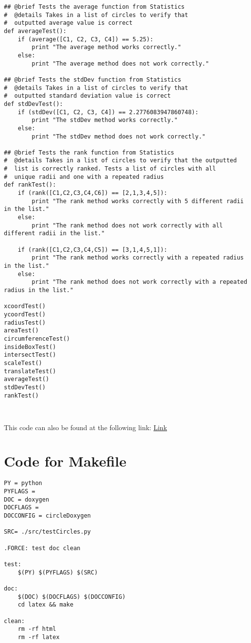 \documentclass[12pt]{article}
\begin{document}
\begin{lstlisting}
## @brief Tests the average function from Statistics
#  @details Takes in a list of circles to verify that
#  outputted average value is correct
def averageTest():
    if (average([C1, C2, C3, C4]) == 5.25):
        print "The average method works correctly."
    else:
        print "The average method does not work correctly."

## @brief Tests the stdDev function from Statistics
#  @details Takes in a list of circles to verify that
#  outputted standard deviation value is correct
def stdDevTest():
    if (stdDev([C1, C2, C3, C4]) == 2.2776083947860748):
        print "The stdDev method works correctly."
    else:
        print "The stdDev method does not work correctly."

## @brief Tests the rank function from Statistics
#  @details Takes in a list of circles to verify that the outputted
#  list is correctly ranked. Tests a list of circles with all
#  unique radii and one with a repeated radius
def rankTest():
    if (rank([C1,C2,C3,C4,C6]) == [2,1,3,4,5]):
        print "The rank method works correctly with 5 different radii in the list."
    else:
        print "The rank method does not work correctly with all different radii in the list."

    if (rank([C1,C2,C3,C4,C5]) == [3,1,4,5,1]):
        print "The rank method works correctly with a repeated radius in the list."
    else:
        print "The rank method does not work correctly with a repeated radius in the list."

xcoordTest()
ycoordTest()
radiusTest()
areaTest()
circumferenceTest()
insideBoxTest()
intersectTest()
scaleTest()
translateTest()
averageTest()
stdDevTest()
rankTest()
\end{lstlisting}

~\newline

\noindent This code can also be found at the following link:
\href{https://gitlab.cas.mcmaster.ca/se2aa4_cs2me3_assignments/patelm16/blob/master/A1/src/testCircles.py}{Link}

\newpage

\section{Code for Makefile} \label{MyMakefileSect}
\begin{lstlisting}
PY = python
PYFLAGS =
DOC = doxygen
DOCFLAGS =
DOCCONFIG = circleDoxygen

SRC= ./src/testCircles.py

.FORCE: test doc clean

test:
	$(PY) $(PYFLAGS) $(SRC)

doc:
	$(DOC) $(DOCFLAGS) $(DOCCONFIG)
	cd latex && make

clean:
	rm -rf html
	rm -rf latex
\end{lstlisting}
\end{document}
